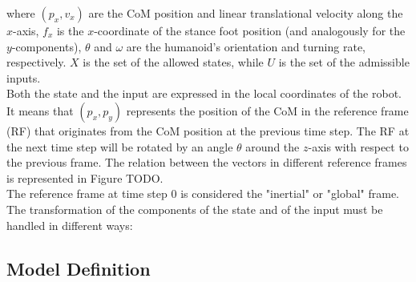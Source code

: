 \documentclass[main.tex]{subfiles}
\begin{document}
where $(p_x, v_x)$ are the CoM position and linear translational velocity along the $x$-axis, $f_x$ is the $x$-coordinate of the stance foot position (and analogously for the $y$-components), $\theta$ and $\omega$ are the humanoid's orientation and turning rate, respectively. $X$ is the set of the allowed states, while $U$ is the set of the admissible inputs.\\
Both the state and the input are expressed in the local coordinates of the robot. It means that $(p_x, p_y)$ represents the position of the CoM in the reference frame (RF) that originates from the CoM position at the previous time step. The RF at the next time step will be rotated by an angle $\theta$ around the $z$-axis with respect to the previous frame. The relation between the vectors in different reference frames is represented in Figure TODO.\\
The reference frame at time step 0 is considered the "inertial" or "global" frame. The transformation of the components of the state and of the input must be handled in different ways:

\subsection{Model Definition}
\end{document}
